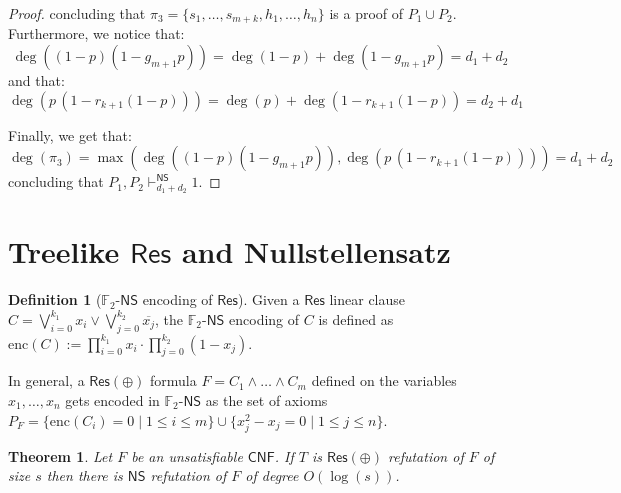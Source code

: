\documentclass[12pt]{article}
\newtheorem{theorem}{Theorem}
\theoremstyle{definition}
\newtheorem{definition}{Definition}
\newcommand{\F}{\mathbb{F}}
\newcommand{\Res}{\mathsf{Res}}
\newcommand{\ResP}{\mathsf{Res(\oplus)}}
\newcommand{\NS}{\mathsf{NS}}
\newcommand{\FNS}{\F_2\text{-}\mathsf{NS}}
\newcommand{\CNF}{\mathsf{CNF}}
\newcommand{\enc}{\mathrm{enc}}
\begin{document}
\begin{proof}
        concluding that $\pi_3 = \{s_1, \ldots, s_{m+k}, h_1, \ldots, h_n\}$ is a proof of $P_1 \cup P_2$. Furthermore, we notice that:
        \[\deg((1-p)(1-g_{m+1}p)) = \deg(1-p) + \deg(1-g_{m+1}p) = d_1 + d_2\]
        and that:
        \[\deg(p\,(1-r_{k+1}(1-p))) = \deg(p) + \deg(1-r_{k+1}(1-p)) = d_2 + d_1\]

        Finally, we get that:
        \[\deg(\pi_3) = \max(\deg((1-p)(1-g_{m+1}p)), \deg(p\,(1-r_{k+1}(1-p)))) = d_1 + d_2\]
        concluding that $P_1, P_2 \vdash_{d_1+d_2}^\NS 1$.

    \end{proof}

    \newpage

    \section{Treelike $\Res$ and Nullstellensatz}

    \begin{definition}[$\FNS$ encoding of $\Res$]
        Given a $\Res$ linear clause $C = \bigvee\limits_{i = 0}^{k_1} x_i \lor  \bigvee\limits_{j = 0}^{k_2} \overline{x_j}$, the $\FNS$ encoding of $C$ is defined as $\enc(C) := \prod\limits_{i = 0}^{k_1} x_i \cdot \prod\limits_{j = 0}^{k_2} (1-x_j)$.
        
        In general, a $\ResP$ formula $F = C_1 \land \ldots \land C_m$ defined on the variables $x_1, \ldots, x_n$ gets encoded in $\FNS$ as the set of axioms $P_F = \{\enc(C_i) = 0 \mid 1 \leq i \leq m\} \cup \{x_j^2-x_j = 0 \mid 1 \leq j \leq n\}$.
    \end{definition}

    \begin{theorem}
        Let $F$ be an unsatisfiable $\CNF$. If $T$ is $\ResP$ refutation of $F$ of size $s$ then there is $\NS$ refutation of $F$ of degree $O(\log(s))$.
    \end{theorem}
\end{document}
